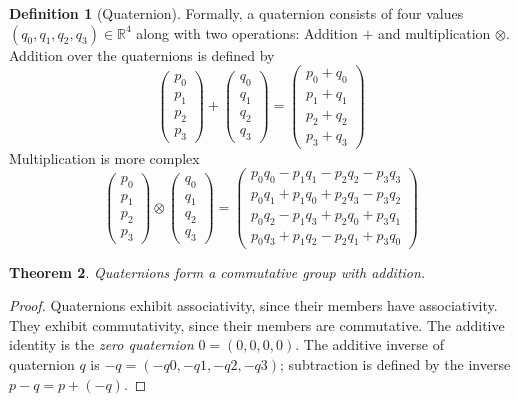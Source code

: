 \documentclass{amsart}
\newtheorem{theorem}{Theorem}[section]
\theoremstyle{definition}
\newtheorem{definition}[theorem]{Definition}
\theoremstyle{remark}
\numberwithin{equation}{section}
\begin{document}
\begin{definition}[Quaternion]
  Formally, a quaternion consists of four values $(q_0, q_1, q_2, q_3)\in\mathbb{R}^4$ along with two operations: Addition $+$ and multiplication $\otimes$.
  Addition over the quaternions is defined by
  \begin{equation}
    \begin{pmatrix}
      p_0 \\
      p_1 \\
      p_2 \\
      p_3
    \end{pmatrix} +
    \begin{pmatrix}
      q_0 \\
      q_1 \\
      q_2 \\
      q_3
    \end{pmatrix} =
    \begin{pmatrix}
      p_0 + q_0 \\
      p_1 + q_1 \\
      p_2 + q_2 \\
      p_3 + q_3
    \end{pmatrix}
  \end{equation}
  Multiplication is more complex
  \begin{equation}
    \begin{pmatrix}
      p_0 \\
      p_1 \\
      p_2 \\
      p_3
    \end{pmatrix} \otimes 
    \begin{pmatrix}
      q_0 \\
      q_1 \\
      q_2 \\
      q_3
    \end{pmatrix} =
    \begin{pmatrix}
      p_0q_0 - p_1q_1 - p_2q_2 - p_3q_3 \\
      p_0q_1 + p_1q_0 + p_2q_3 - p_3q_2 \\
      p_0q_2 - p_1q_3 + p_2q_0 + p_3q_1 \\
      p_0q_3 + p_1q_2 - p_2q_1 + p_3q_0
    \end{pmatrix}
  \end{equation} \label{multiplication}
\end{definition}

\begin{theorem}
  Quaternions form a commutative group with addition.
\end{theorem}
\begin{proof}
  Quaternions exhibit associativity, since their members have associativity. They exhibit commutativity, since their members are commutative. The additive identity is the \emph{zero quaternion} $0=\left(0, 0, 0, 0\right)$. The additive inverse of quaternion $q$ is $-q=(-q0, -q1, -q2, -q3)$; subtraction is defined by the inverse $p-q = p+(-q)$.
\end{proof}
\end{document}
